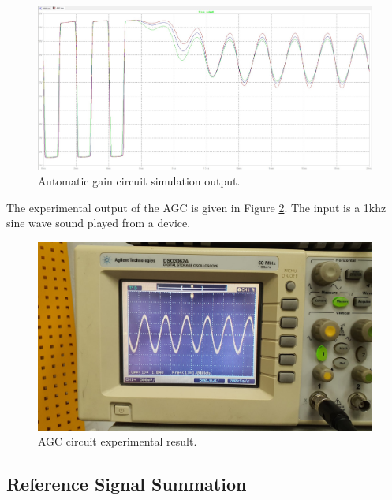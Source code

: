 \documentclass[a4paper,10pt]{IEEEtran}
\begin{document}
\begin{figure}[htbp!]
    \centering
    \includegraphics[width = 1\linewidth]{AGC Simulation Output.jpg}
    \caption{Automatic gain circuit simulation output.}
    \label{AGC_sim_output}
\end{figure} 
The experimental output of the AGC is given in Figure \ref{agc_osc}. The input is a 1khz sine wave sound played from a device.
\begin{figure}[htbp!]
    \centering
    \includegraphics[width = 1\linewidth]{AGC_Experimental.jpeg}
    \caption{AGC circuit experimental result.}
    \label{agc_osc}
\end{figure} 
\subsection{Reference Signal Summation}
\end{document}
